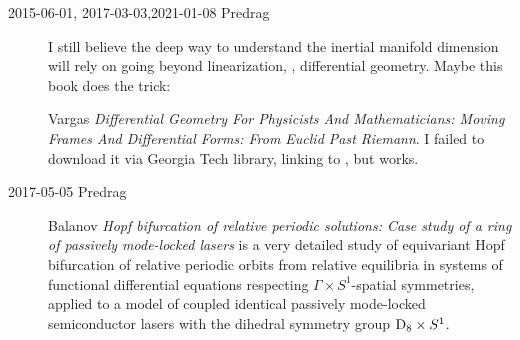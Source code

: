 \begin{description}
\item[2015-06-01, 2017-03-03,2021-01-08 Predrag]
I still believe the deep way to understand the inertial manifold
dimension will rely on going beyond linearization,
\ie, differential geometry. Maybe this book does the trick:

Vargas {\em {Differential Geometry For Physicists And
Mathematicians: Moving Frames And Differential Forms: From Euclid Past
Riemann}}. I failed to download it via Georgia Tech library, linking to
, but
 works.

\item[2017-05-05 Predrag]
Balanov \etal{} {\em Hopf bifurcation of relative periodic
solutions: {Case} study of a ring of passively mode-locked lasers}
is a very detailed study of equivariant Hopf bifurcation of relative periodic
orbits from relative equilibria in systems of functional differential
equations respecting $\Gamma \times S^1$-spatial symmetries, applied to a
model of coupled identical passively mode-locked semiconductor lasers with
the dihedral symmetry group $\textrm{D}_{8} \times S^1$.


\end{description}
